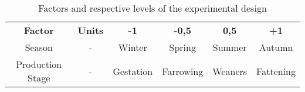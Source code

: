 \begin{table}[]
\centering
\caption{Factors and respective levels of the experimental design}
\label{table4}
\begin{tabular}{cccccc}
\textbf{Factor}  & \textbf{Units} & \textbf{-1} & \textbf{-0,5} & \textbf{0,5} & \textbf{+1} \\
Season           & -              & Winter      & Spring        & Summer       & Autumn      \\
Production Stage & -              & Gestation   & Farrowing     & Weaners      & Fattening  
\end{tabular}
\end{table}